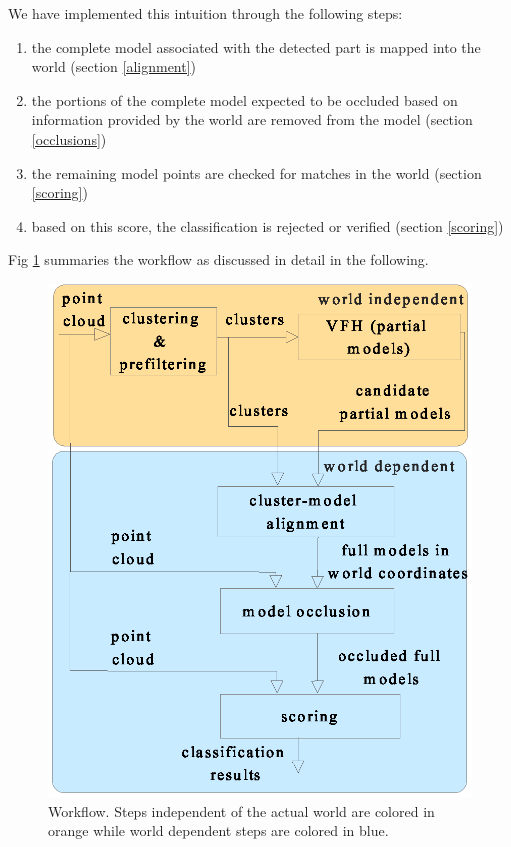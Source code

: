 \documentclass[letterpaper, 10pt, conference]{ieeeconf}
\def\figw{\columnwidth}
\begin{document}
We have implemented this intuition through the following steps:

\begin{enumerate}
  \item the complete model associated with the detected part is mapped into the
  world (section \ref{alignment})
  \item the portions of the complete model expected to be occluded based on
  information provided by the world are removed from the model (section \ref{occlusions})
  \item the remaining model points are checked for matches in the world (section \ref{scoring})
  \item based on this score, the classification is rejected or verified (section
  \ref{scoring})
\end{enumerate}

Fig \ref{uml} summaries the workflow as discussed in
detail in the following.



\begin{figure}[t]
   \vspace{-5pt}
   \includegraphics[width=\figw]{images/Concept1.eps}
   \vspace{-15pt}
   \caption{Workflow. Steps independent of the actual world are colored in orange while world dependent steps are colored in blue. }
   \label{uml}
   \vspace{-10pt}
\end{figure}
\end{document}
